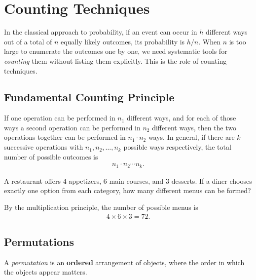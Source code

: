 \section{Counting Techniques}

In the classical approach to probability, if an event can occur in $h$ different ways out of a total of $n$ equally likely outcomes, its probability is $h/n$. When $n$ is too large to enumerate the outcomes one by one, we need systematic tools for \emph{counting} them without listing them explicitly. This is the role of counting techniques.

\subsection{Fundamental Counting Principle}

\begin{teorema}
	If one operation can be performed in $n_1$ different ways, and for each of those ways a second operation can be performed in $n_2$ different ways, then the two operations together can be performed in $n_1 \cdot n_2$ ways. In general, if there are $k$ successive operations with $n_1, n_2, \ldots, n_k$ possible ways respectively, the total number of possible outcomes is
	\begin{align}
		\label{eq:conteo.1}
		n_1 \cdot n_2 \cdots n_k.
	\end{align}
\end{teorema}

\begin{ejemplo}
	\label{exmp:conteo.1}
	A restaurant offers $4$ appetizers, $6$ main courses, and $3$ desserts. If a diner chooses exactly one option from each category, how many different menus can be formed?
\end{ejemplo}

\begin{solucion}
	By the multiplication principle, the number of possible menus is
	\begin{align}
		4 \times 6 \times 3 = 72.
	\end{align}
\end{solucion}

\subsection{Permutations}

A \emph{permutation} is an \textbf{ordered} arrangement of objects, where the order in which the objects appear matters.


